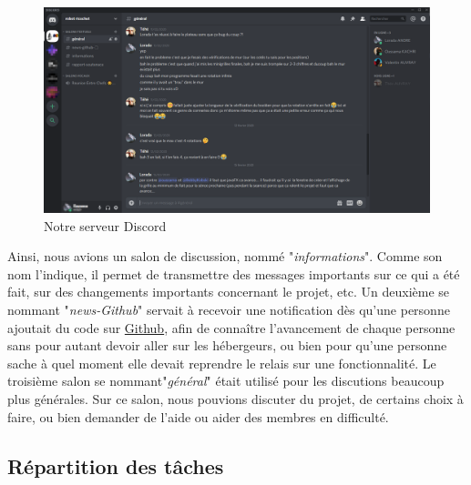 \documentclass[a4paper, 12pt]{article}
\begin{document}
			\begin{figure}[H]
				\centering\includegraphics[scale=1]{images/discord.png}
				\caption{Notre serveur Discord}
			\end{figure}
			
			 Ainsi, nous avions un salon de discussion, nommé "\textit{informations}". Comme son nom l'indique, il permet de transmettre des messages importants sur ce qui a été fait, sur des changements importants concernant le projet, etc. Un deuxième se nommant "\textit{news-Github}" servait à recevoir une notification dès qu'une personne ajoutait du code sur \href{https://github.com/}{Github}, afin de connaître l'avancement de chaque personne sans pour autant devoir aller sur les hébergeurs, ou bien pour qu'une personne sache à quel moment elle devait reprendre le relais sur une fonctionnalité. Le troisième salon se nommant"\textit{général}" était utilisé pour les discutions beaucoup plus générales. Sur ce salon, nous pouvions discuter du projet, de certains choix à faire, ou bien demander de l'aide ou aider des membres en difficulté.
			
			
    \subsection{Répartition des tâches}
    
\end{document}
